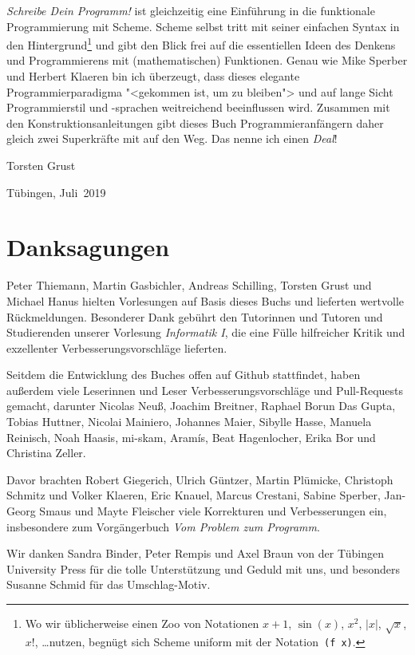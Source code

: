 \textit{Schreibe Dein Programm!} ist gleichzeitig eine Einführung in die
funktionale Programmierung mit Scheme.  Scheme selbst tritt mit seiner
einfachen Syntax in den Hintergrund\footnote{Wo wir üblicherweise einen
Zoo von Notationen $x+1$, $\sin(x)$, $x^2$, $\vert x\vert$, $\sqrt{x}$,
$x!$, \dots nutzen, begnügt sich Scheme uniform mit der
Notation~\texttt{(f~x)}.} und gibt den Blick frei auf die essentiellen
Ideen des Denkens und Programmierens mit (mathematischen) Funktionen.
Genau wie Mike Sperber und Herbert Klaeren bin ich überzeugt, dass
dieses elegante Programmierparadigma "<gekommen ist, um zu bleiben"> und
auf lange Sicht Programmierstil und -sprachen weitreichend beeinflussen
wird.  Zusammen mit den Konstruktionsanleitungen gibt dieses Buch
Programmieranfängern daher gleich zwei Superkräfte mit auf den Weg.  Das
nenne ich einen \emph{Deal}!
%
\begin{flushright}
  Torsten Grust

  Tübingen, Juli~2019
\end{flushright}

\section*{Danksagungen}

Peter Thiemann, Martin Gasbichler, Andreas Schilling, Torsten Grust und Michael Hanus hielten
Vorlesungen auf Basis dieses Buchs und lieferten wertvolle Rückmeldungen.
Besonderer Dank gebührt den Tutorinnen und Tutoren und Studierenden unserer Vorlesung
\textit{Informatik I}, die eine
Fülle hilfreicher Kritik und exzellenter Verbesserungsvorschläge
lieferten.

Seitdem die Entwicklung des Buches offen auf Github stattfindet, haben
außerdem viele Leserinnen und Leser Verbesserungsvorschläge und
Pull-Requests gemacht, darunter Nicolas Neuß, Joachim Breitner,
Raphael Borun Das Gupta, Tobias Huttner, Nicolai Mainiero, Johannes
Maier, Sibylle Hasse, Manuela Reinisch, Noah Haasis, mi-skam,
Aramís, Beat Hagenlocher, Erika Bor und Christina Zeller.

Davor brachten Robert Giegerich, Ulrich Güntzer, Martin Plümicke,
Christoph Schmitz und Volker Klaeren, Eric Knauel, Marcus Crestani,
Sabine Sperber, Jan-Georg Smaus und Mayte Fleischer viele Korrekturen
und Verbesserungen ein, insbesondere zum Vorgängerbuch \textit{Vom
  Problem zum Programm}.

Wir danken Sandra Binder, Peter Rempis und Axel Braun von der Tübingen
University Press für die tolle Unterstützung und Geduld mit uns,
und besonders Susanne Schmid für das Umschlag-Motiv.


